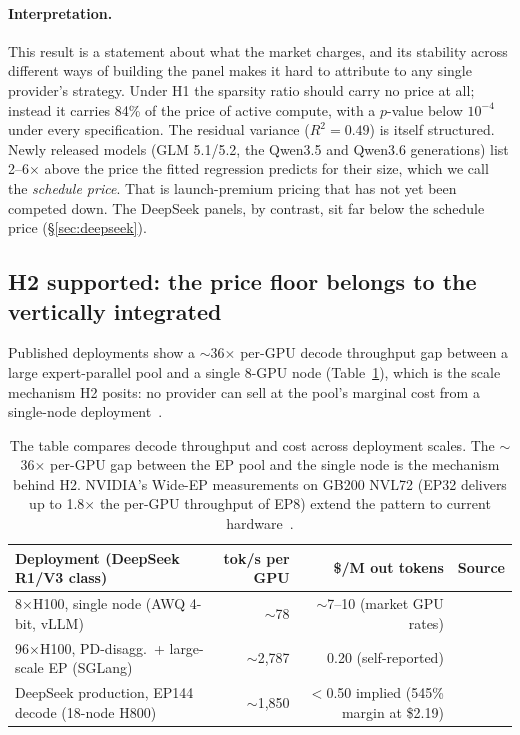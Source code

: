 \documentclass[11pt]{article}
\begin{document}
\paragraph{Interpretation.}
This result is a statement about what the market charges, and its stability
across different ways of building the panel makes it hard to attribute to
any single provider's strategy. Under H1 the sparsity ratio should carry no
price at all; instead it carries 84\% of the price of active compute, with a
$p$-value below $10^{-4}$ under every specification. The residual variance
($R^2 = 0.49$) is itself structured. Newly released models (GLM 5.1/5.2, the
Qwen3.5 and Qwen3.6 generations) list 2--6$\times$ above the price the fitted
regression predicts for their size, which we call the \emph{schedule price}.
That is launch-premium pricing that has not yet been competed down. The
DeepSeek panels, by contrast, sit far below the schedule price
(\S\ref{sec:deepseek}).

\subsection{H2 supported: the price floor belongs to the vertically
integrated}
\label{sec:h2result}

Published deployments show a $\sim$36$\times$ per-GPU decode throughput
gap between a large expert-parallel pool and a single 8-GPU node
(Table~\ref{tab:deploy}), which is the scale mechanism H2 posits: no
provider can sell at the pool's marginal cost from a single-node
deployment~\cite{r8,r9,r10}.

\begin{table}[t]
\centering
\caption{The table compares decode throughput and cost across deployment
scales. The $\sim$36$\times$ per-GPU gap between the EP pool and the single
node is the mechanism behind H2. NVIDIA's Wide-EP measurements on GB200 NVL72
(EP32 delivers up to 1.8$\times$ the per-GPU throughput of EP8) extend the
pattern to current hardware~\cite{r11}.}
\label{tab:deploy}
\footnotesize
\setlength{\tabcolsep}{4pt}
\begin{tabular}{lrrl}
\toprule
Deployment (DeepSeek R1/V3 class) & tok/s per GPU & \$/M out tokens & Source \\
\midrule
8$\times$H100, single node (AWQ 4-bit, vLLM) & $\sim$78 & $\sim$7--10 (market GPU rates) & \cite{r9} \\
96$\times$H100, PD-disagg.\ + large-scale EP (SGLang) & $\sim$2{,}787 & 0.20 (self-reported) & \cite{r8} \\
DeepSeek production, EP144 decode (18-node H800) & $\sim$1{,}850 & $<$0.50 implied (545\% margin at \$2.19) & \cite{r10} \\
\bottomrule
\end{tabular}
\end{table}
\end{document}
